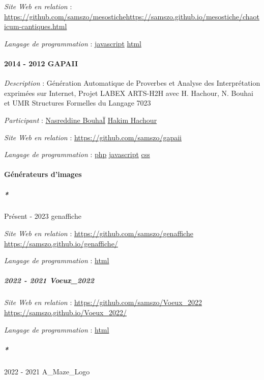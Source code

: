 \documentclass[
  a4paper,
  DIV=11,
  numbers=noendperiod]{scrreprt}
\let\oldparagraph\paragraph
\renewcommand{\paragraph}[1]{\oldparagraph{#1}\mbox{}}
\let\oldsubparagraph\subparagraph
\renewcommand{\subparagraph}[1]{\oldsubparagraph{#1}\mbox{}}
\begin{document}
\emph{Site Web en relation} :
\url{https://github.com/samszo/mesostiche}\url{https://samszo.github.io/mesostiche/chaoticum-cantiques.html}

\emph{Langage de programmation} :
\href{http://localhost/samszo/omk/s/fiches/item/89711}{javascript}
\href{http://localhost/samszo/omk/s/fiches/item/96621}{html}

\paragraph{2014 - 2012 GAPAII}\label{sec-item301893}

\emph{Description} : Génération Automatique de Proverbes et Analyse des
Interprétation exprimées sur Internet, Projet LABEX ARTS-H2H avec H.
Hachour, N. Bouhai et UMR Structures Formelles du Langage 7023

\emph{Participant} :
\href{http://localhost/samszo/omk/s/fiches/item/61152}{Nasreddine
BouhaÏ} \href{http://localhost/samszo/omk/s/fiches/item/61522}{Hakim
Hachour}

\emph{Site Web en relation} : \url{https://github.com/samszo/gapaii}

\emph{Langage de programmation} :
\href{http://localhost/samszo/omk/s/fiches/item/108369}{php}
\href{http://localhost/samszo/omk/s/fiches/item/89711}{javascript}
\href{http://localhost/samszo/omk/s/fiches/item/102418}{css}

\paragraph{Générateurs d'images}\label{guxe9nuxe9rateurs-dimages}

\subparagraph*{Présent - 2023 genaffiche}\label{sec-item299721}

\emph{Site Web en relation} : \url{https://github.com/samszo/genaffiche}
\url{https://samszo.github.io/genaffiche/}

\emph{Langage de programmation} :
\href{http://localhost/samszo/omk/s/fiches/item/96621}{html}

\subparagraph{2022 - 2021 Voeux\_2022}\label{sec-item301894}

\emph{Site Web en relation} : \url{https://github.com/samszo/Voeux_2022}
\url{https://samszo.github.io/Voeux_2022/}

\emph{Langage de programmation} :
\href{http://localhost/samszo/omk/s/fiches/item/96621}{html}

\subparagraph*{2022 - 2021 A\_Maze\_Logo}\label{sec-item301887}
\end{document}
